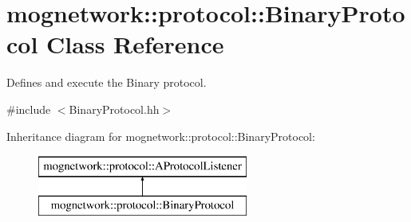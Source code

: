 \hypertarget{classmognetwork_1_1protocol_1_1_binary_protocol}{\section{mognetwork\-:\-:protocol\-:\-:Binary\-Protocol Class Reference}
\label{classmognetwork_1_1protocol_1_1_binary_protocol}
}


Defines and execute the Binary protocol.  




{\ttfamily \#include $<$Binary\-Protocol.\-hh$>$}

Inheritance diagram for mognetwork\-:\-:protocol\-:\-:Binary\-Protocol\-:\begin{figure}[H]
\begin{center}
\leavevmode
\includegraphics[height=2.000000cm]{classmognetwork_1_1protocol_1_1_binary_protocol}
\end{center}
\end{figure}
